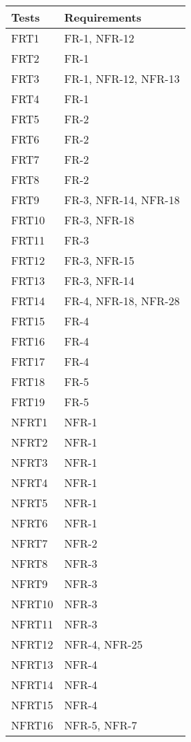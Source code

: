 \documentclass[12pt, titlepage]{article}
\begin{document}
\begin{longtable}{| p{} | p{} |} 
  \hline
  \textbf{Tests}    &   \textbf{Requirements} \\ \hline
  FRT1 &  FR-1, NFR-12 \\ \hline          
  FRT2 &  FR-1  \\ \hline
  FRT3 &   FR-1, NFR-12, NFR-13 \\ \hline
   FRT4 &   FR-1 \\ \hline
   FRT5 &  FR-2  \\ \hline
   FRT6 &  FR-2  \\ \hline
  FRT7  &  FR-2  \\ \hline
  FRT8 &  FR-2  \\ \hline
  FRT9 &  FR-3, NFR-14, NFR-18  \\ \hline
  FRT10 &  FR-3, NFR-18  \\ \hline
  FRT11 &  FR-3  \\ \hline
  FRT12 &  FR-3, NFR-15  \\ \hline
  FRT13 &  FR-3, NFR-14  \\ \hline
  FRT14 &  FR-4, NFR-18, NFR-28  \\ \hline
  FRT15 &  FR-4  \\ \hline
  FRT16 &  FR-4  \\ \hline
  FRT17 &  FR-4  \\ \hline
  FRT18 &  FR-5  \\ \hline
  FRT19 &  FR-5  \\ \hline
  NFRT1 &  NFR-1  \\ \hline
  NFRT2 &  NFR-1  \\ \hline
  NFRT3 &  NFR-1  \\ \hline
  NFRT4 &  NFR-1  \\ \hline
  NFRT5 &  NFR-1  \\ \hline
  NFRT6 &  NFR-1  \\ \hline
  NFRT7 &  NFR-2  \\ \hline
  NFRT8 &  NFR-3  \\ \hline
  NFRT9 &   NFR-3 \\ \hline
  NFRT10 &  NFR-3  \\ \hline
  NFRT11 &  NFR-3  \\ \hline
  NFRT12 &  NFR-4, NFR-25  \\ \hline
  NFRT13 &  NFR-4  \\ \hline
  NFRT14 &  NFR-4  \\ \hline
  NFRT15 &  NFR-4  \\ \hline
  NFRT16 &  NFR-5, NFR-7  \\ \hline

\end{longtable}
\end{document}
